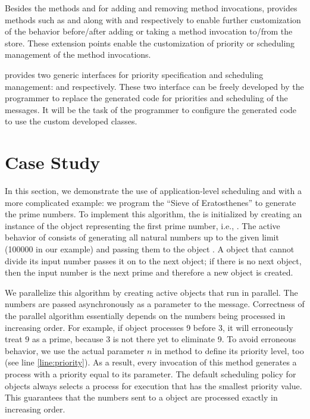 Besides the methods  and  for adding and removing method invocations,  provides methods such as  and  along with  and  respectively to enable  further customization of the behavior before/after adding or taking a method invocation to/from the store. These extension points enable the customization of priority or scheduling management of the method invocations.

\Crisp provides two generic interfaces for priority specification and scheduling management:  and  respectively. These two interface can be freely developed by the programmer to replace the generated code for priorities and scheduling of the messages. It will be the task of the programmer to configure the generated code to use the custom developed classes.

\section{Case Study} \label{sec:caseStudy}

In this section, we demonstrate the use of application-level scheduling and \Crisp with a more complicated example: we program the ``Sieve of Eratosthenes'' %
to generate the prime numbers. 
To implement this algorithm, the 
 is initialized by creating an instance of the  object representing the first prime number, i.e., . The active behavior of  consists of generating all natural numbers up to the given limit (100000 in our example) and passing them to the object . 
A  object that cannot divide its input number passes it on to the next  object; if there is no next object, then the input number is the next prime and therefore a new object is created.

We parallelize this algorithm by creating active objects that run in parallel.
The numbers are passed asynchronously as a parameter to the  message. 
Correctness of the parallel algorithm essentially depends on the numbers being processed in increasing order.
For example, if object  processes 9 before 3, it will erroneously treat 9 as a prime, because 3 is not there yet to eliminate 9. 
%
To avoid erroneous behavior, we use the actual parameter $n$ in  method to define its priority level, too (see line \ref{line:priority}). 
As a result, every invocation of this method generates a process with a priority equal to its parameter.
The default scheduling policy for objects always selects a process for execution that has the smallest priority value. 
This guarantees that the numbers sent to a  object are processed exactly in increasing order. 

